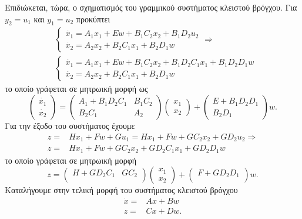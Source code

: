 Επιδιώκεται, τώρα, ο σχηματισμός του γραμμικού συστήματος κλειστού βρόγχου. Για
$y_2 = u_1$ και $y_1 = u_2$ προκύπτει
\begin{align*}
    &
    \begin{cases}
        \dot{x_1} = A_1 x_1 + E w + B_1 C_2 x_2 + B_1 D_2 u_2\\
        \dot{x_2} = A_2 x_2 + B_2 C_1 x_1 + B_2 D_1 w 
    \end{cases}\Rightarrow\\
    &
    \begin{cases}
        \dot{x_1} = A_1 x_1 + E w + B_1 C_2 x_2 + B_1 D_2 C_1 x_1 + B_1 D_2 D_1 
        w\\
        \dot{x_2} = A_2 x_2 + B_2 C_1 x_1 + B_2 D_1 w
    \end{cases}    
\end{align*}
το οποίο γράφεται σε μητρωική μορφή ως
\begin{equation*}
    \begin{pmatrix}
        \dot{x_1} \\
        \dot{x_2}
    \end{pmatrix}=
    \begin{pmatrix}
        A_1 + B_1 D_2 C_1 & B_1 C_2 \\
        B_2 C_1 & A_2 
    \end{pmatrix}
    \begin{pmatrix}
        x_1 \\
        x_2
    \end{pmatrix}
    +
    \begin{pmatrix}
        E + B_1 D_2 D_1 \\
        B_2 D_1
    \end{pmatrix} w.
\end{equation*}
Για την έξοδο του συστήματος έχουμε
\begin{align*}
    z =& H x_1 + Fw + G u_1 = H x_1 + Fw + G C_2 x_2 + G D_2 u_2 \Rightarrow \\
    z =& H x_1 + Fw + G C_2 x_2 + G D_2 C_1 x_1 + G D_2 D_1 w 
\end{align*}
το οποίο γράφεται σε μητρωική μορφή
\begin{equation*}
    z =
    \begin{pmatrix}
        H+G D_2 C_1 & G C_2 \\
    \end{pmatrix}
    \begin{pmatrix}
        x_1 \\
        x_2
    \end{pmatrix}
    +
    \begin{pmatrix}
        F + G D_2 D_1 \\
    \end{pmatrix} w.
\end{equation*}
Καταλήγουμε στην τελική μορφή του συστήματος κλειστού βρόγχου
\begin{align*}
    \dot{x} =& Ax + Bw \\
    z =& Cx + Dw.
\end{align*}

